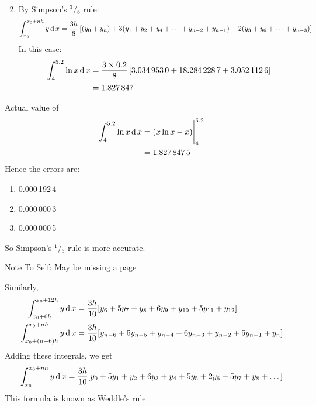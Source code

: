 \documentclass[12pt,class=book,crop=false]{standalone}
\begin{document}
\begin{soln}
\begin{enumerate}[label=(\roman*)]
\begin{align*}
              \end{align*}
        \item By Simpson's $ {}^3/{}_8 $ rule:
              \[
                  \int_{x_0}^{x_0+nh} y \,\mathrm{d}\, x =\frac{3h}{8}\left[ (y_0+y_n)+3(y_1+y_2+y_4+\dots+y_{n-2}+y_{n-1})+2(y_3+y_6+\dots+y_{n-3})\right]
              \]
              In this case:
              \begin{align*}
                  \int_{4}^{5.2} \ln x \,\mathrm{d}\, x & = \frac{3\times 0.2}{8}\left[ 3.034\,953\,0+18.284\,228\,7+3.052\,112\,6\right] \\
                                           & =1.827\,847
              \end{align*}
    \end{enumerate}
    Actual value of
    \begin{align*}
        \int_4^{5.2}\ln x\,\mathrm{d}\, x & =(x\ln x-x)\Biggr\vert_4^{5.2} \\
                             & =1.827\,847\,5
    \end{align*}
    Hence the errors are:
    \begin{enumerate}[label=(\roman*)]
        \item 0.000\,192\,4
        \item 0.000\,000\,3
        \item 0.000\,000\,5
    \end{enumerate}
    So Simpson's $ {}^1/{}_3 $ rule is more accurate.
\end{soln}
\vspace{2.5cm}
Note To Self: May be missing a page\\
\vspace{2.5cm}


Similarly,
\begin{align*}
    \int_{x_0+6h}^{x_0+12h}y\,\mathrm{d}\, x    & =\frac{3h}{10}[y_6+5y_7+y_8+6y_9+y_{10}+5y_{11}+y_{12}]                  \\
    \int_{x_0+(n-6)h}^{x_0+nh}y\,\mathrm{d}\, x & =\frac{3h}{10}[y_{n-6}+5y_{n-5}+y_{n-4}+6y_{n-3}+y_{n-2}+5y_{n-1}+y_{n}]
\end{align*}
Adding these integrals, we get
\[
    \int_{x_0}^{x_0+nh}y\,\mathrm{d}\, x=\frac{3h}{10}[y_{0}+5y_{1}+y_{2}+6y_{3}+y_{4}+5y_{5}+2y_{6}+5y_7+y_8+\dots]
\]
This formula is known as Weddle's rule.
\end{document}
